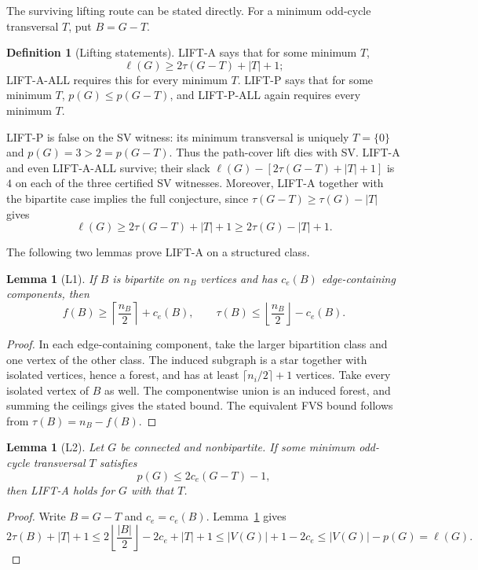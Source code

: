 \documentclass[11pt]{article}
\theoremstyle{plain}
\newtheorem{lemma}[theorem]{Lemma}
\theoremstyle{definition}
\newtheorem{definition}[theorem]{Definition}
\newcommand{\FVS}{\tau}
\newcommand{\lf}{\ell}
\begin{document}
The surviving lifting route can be stated directly.  For a minimum odd-cycle
transversal $T$, put $B=G-T$.

\begin{definition}[Lifting statements]\label{def:lift}
LIFT-A says that for some minimum $T$,
\[
 \lf(G)\ge 2\FVS(G-T)+|T|+1;
\]
LIFT-A-ALL requires this for every minimum $T$.  LIFT-P says that for some
minimum $T$, $p(G)\le p(G-T)$, and LIFT-P-ALL again requires every minimum
$T$.
\end{definition}

LIFT-P is false on the SV witness: its minimum transversal is uniquely
$T=\{0\}$ and $p(G)=3>2=p(G-T)$.  Thus the path-cover lift dies with SV.
LIFT-A and even LIFT-A-ALL survive; their slack
$\lf(G)-[2\FVS(G-T)+|T|+1]$ is $4$ on each of the three certified SV
witnesses.  Moreover, LIFT-A together
with the bipartite case implies the full conjecture, since
$\FVS(G-T)\ge\FVS(G)-|T|$ gives
\[
 \lf(G)\ge2\FVS(G-T)+|T|+1
 \ge2\FVS(G)-|T|+1.
\]

The following two lemmas prove LIFT-A on a structured class.

\begin{lemma}[L1]\label{lem:L1}
If $B$ is bipartite on $n_B$ vertices and has $c_e(B)$ edge-containing
components, then
\[
 f(B)\ge \left\lceil\frac{n_B}{2}\right\rceil+c_e(B),
 \qquad
 \FVS(B)\le \left\lfloor\frac{n_B}{2}\right\rfloor-c_e(B).
\]
\end{lemma}

\begin{proof}
In each edge-containing component, take the larger bipartition class and one
vertex of the other class.  The induced subgraph is a star together with
isolated vertices, hence a forest, and has at least
$\lceil n_i/2\rceil+1$ vertices.  Take every isolated vertex of $B$ as well.
The componentwise union is an induced forest, and summing the ceilings gives
the stated bound.  The equivalent FVS bound follows from $\FVS(B)=n_B-f(B)$.
\end{proof}

\begin{lemma}[L2]\label{lem:L2}
Let $G$ be connected and nonbipartite.  If some minimum odd-cycle transversal
$T$ satisfies
\[
 p(G)\le2c_e(G-T)-1,
\]
then LIFT-A holds for $G$ with that $T$.
\end{lemma}

\begin{proof}
Write $B=G-T$ and $c_e=c_e(B)$.  Lemma~\ref{lem:L1} gives
\[
 2\FVS(B)+|T|+1
 \le2\left\lfloor\frac{|B|}{2}\right\rfloor-2c_e+|T|+1
 \le |V(G)|+1-2c_e
 \le |V(G)|-p(G)=\lf(G).
\]
\end{proof}
\end{document}
